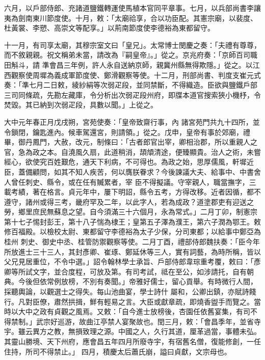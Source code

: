 \begin{pinyinscope}
 六月，以戶部侍郎、充諸道鹽鐵轉運使馬植本官同平章事。七月，以兵部尚書李讓夷為劍南東川節度使。十月，敕：「太廟祫享，合以功臣配。其憲宗廟，以裴度、杜黃裳、李愬、高崇文等配享。」以荊南節度使李德裕為東都留守。



 十一月，有司享太廟，其穆宗室文曰「皇兄」。太常博士閔慶之奏：「夫禮有尊尊，而不敘親親。祝文稱弟未當，請改為『嗣皇帝』。」從之。京兆府奏：「京師百司職田斛斗，請
 準會昌三年例，許人永自送納京師，親冀州縣無得欺隱。」從之。以江西觀察使周墀為義成軍節度使、鄭滑觀察等使。十二月，刑部尚書、判度支崔元式奏：「準七月二日敕，綾紗絹等次弱疋段，並同禁斷，不得織造。臣欲與鹽鐵戶部三司同條疏，先勘左藏庫，令分析出次弱疋段州府，即牒本道官搜索狹小機杼，令焚毀。其已納到次弱疋段，具數以聞。」上從之。



 大中元年春正月戊戌朔，宮苑使奏：「皇帝致齋行事，內
 諸宮苑門共九十四所，並令鎖閉，鑰匙進內。候車駕還宮，則請領。」從之。戊申，皇帝有事於郊廟，禮畢，御丹鳳門，大赦，改元，制條曰：「古者郎官出宰，卿相治郡，所以重親人之官，急為政之本。自澆風久扇，此道稍消，頡頏清途，便臻顯貴。治人之術，未嘗經心，欲使究百姓艱危，通天下利病，不可得也。為政之始，思厚儒風，軒墀近臣，蓋備顧問，如其不知人疾苦，何以膺朕眷求？今後諫議大夫、給事中、中書舍人曾任刺史、縣令，或在任有贓累者，宰
 臣不得擬議。守宰親人，職當撫字，三載考績，著在格言。貞元年中，屢下明詔，縣令五考，方得改移。近者因循，都不遵守，諸州或得三考，畿府罕及二年，以此字人，若為成政？道塗郡吏有迎送之勞，鄉里庶民無蘇息之望。自今須滿三十六個月，永為常式。」二月丁卯，制憲宗第十七子惕封彭王，第十八子惴為棣王；皇第五子澤為濮王，第六子潤為鄂王。敕修百福殿。以檢校太尉、東都留守李德裕為太子少保，分司東都；以給事中鄭亞為桂州
 刺史、御史中丞、桂管防禦觀察等使。二月丁酉，禮部侍郎魏扶奏：「臣今年所放進士三十三人，其封彥卿、崔琢、鄭延休等三人，實有詞藝，為時所稱，皆以父兄見居重位，不令中選。」詔令翰林學士承旨、戶部侍郎韋琮重考覆，敕曰：「彥卿等所試文字，並合度程，可放及第。有司考試，祗在至公，如涉請托，自有朝典。今後但依常例放榜，不別有奏聞。」帝雅好儒士，留心貢舉。有時微行人間，採聽輿論，以觀選士之得失。每山池曲宴，學士詩什
 屬和，公卿出鎮，亦賦詩餞行。凡對臣僚，肅然拱揖，鮮有輕易之言。大臣或獻章疏，即燒香盥手而覽之。當時以大中之政有貞觀之風焉。又敕：「自今進士放榜後，杏園任依舊宴集，有司不得禁制。」武宗好巡游，故曲江亭禁人宴聚故也。閏三月，敕：「會昌季年，並省寺宇。雖云異方之教，無損致理之源。中國之人，久行其道，厘革過當，事體未弘。其靈山勝境、天下州府，應會昌五年四月所廢寺宇，有宿舊名僧，復能修創，一任住持，所司不得禁止。」
 四月，積慶太后蕭氏崩，謚曰貞獻，文宗母也。




\end{pinyinscope}
